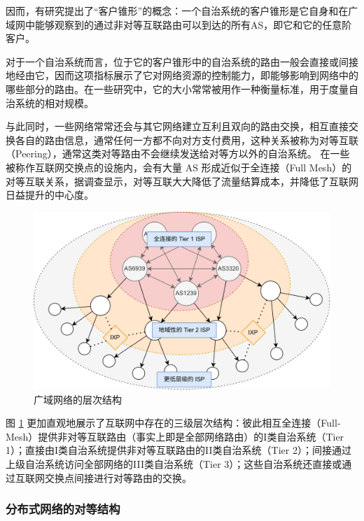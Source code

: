 因而，有研究提出了“客户锥形”的概念：一个自治系统的客户锥形是它自身和在广域网中能够观察到的通过非对等互联路由可以到达的所有AS，即它和它的任意阶客户。


对于一个自治系统而言，位于它的客户锥形中的自治系统的路由一般会直接或间接地经由它，因而这项指标展示了它对网络资源的控制能力，即能够影响到网络中的哪些部分的路由。在一些研究中，它的大小常常被用作一种衡量标准，用于度量自治系统的相对规模。

与此同时，一些网络常常还会与其它网络建立互利且双向的路由交换，相互直接交换各自的路由信息，通常任何一方都不向对方支付费用，这种关系被称为对等互联（Peering），通常这类对等路由不会继续发送给对等方以外的自治系统。  在一些被称作互联网交换点的设施内，会有大量 AS 形成近似于全连接（Full Mesh）的对等互联关系，据调查显示，对等互联大大降低了流量结算成本，并降低了互联网日益提升的中心度。

\begin{figure}[h]
    \includegraphics[width=0.7\linewidth]{chapter/c2_images/c2_wan-asn-structure.png}
    \caption{广域网络的层次结构}
    \label{c2_wan-asn-structure}
\end{figure}

图 \ref{c2_wan-asn-structure} 更加直观地展示了互联网中存在的三级层次结构：彼此相互全连接（Full-Mesh）提供非对等互联路由（事实上即是全部网络路由）的I类自治系统（Tier 1）；直接由I类自治系统提供非对等互联路由的II类自治系统（Tier 2）；间接通过上级自治系统访问全部网络的III类自治系统（Tier 3）；这些自治系统还直接或通过互联网交换点间接进行对等路由的交换。

\subsubsection{分布式网络的对等结构}

